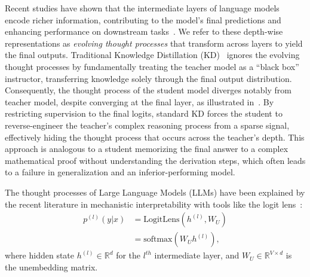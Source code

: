 \documentclass{article}
\theoremstyle{plain}
\theoremstyle{definition}
\theoremstyle{remark}
\begin{document}
Recent studies have shown that the intermediate layers of language models encode richer information, contributing to the model's final predictions and enhancing performance on downstream tasks~\cite{skean2025layer,van2019does,zhang2024investigating}.
We refer to these depth-wise representations as \textit{evolving thought processes} that transform across layers to yield the final outputs.
Traditional Knowledge Distillation (KD)~\cite{hinton2015distilling} ignores the evolving thought processes by fundamentally treating the teacher model as a ``black box'' instructor, transferring knowledge solely through the final output distribution.
Consequently, the thought process of the student model diverges notably from teacher model, despite converging at the final layer, as illustrated in~.
By restricting supervision to the final logits, standard KD forces the student to reverse-engineer the teacher's complex reasoning process from a sparse signal, effectively hiding the thought process that occurs across the teacher's depth.
This approach is analogous to a student memorizing the final answer to a complex mathematical proof without understanding the derivation steps, which often leads to a failure in generalization and an inferior-performing model.

The thought processes of Large Language Models (LLMs) have been explained by the recent literature in mechanistic interpretability with tools like the logit lens~\cite{nostalgebraist2020interpreting}:
\begin{align}
    p^{(l)} (y | x) & =\text{LogitLens}(h^{(l)}, W_U) \\ 
        &= \text{softmax}(W_U h^{(l)}),\label{eq:logit_lens}
\end{align}
where hidden state $h^{(l)} \in \mathbb{R}^{d}$ for the $l^{th}$ intermediate layer, and $W_U \in \mathbb{R}^{V \times d}$ is the unembedding matrix.
\end{document}
